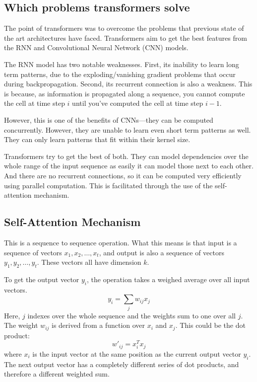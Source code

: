 \subsection{Which problems transformers solve}
The point of transformers was to overcome the problems that previous state of the art architectures have faced. Transformers aim to get the best features from the RNN and Convolutional Neural Network (CNN) models.

The RNN model has two notable weaknesses. First, its inability to learn long term patterns, due to the exploding/vanishing gradient problems that occur during backpropagation.
Second, its recurrent connection is also a weakness. This is because, as information is propagated along a sequence, you cannot compute the cell at time step $i$ until you've computed the cell at time step $i-1$.

However, this is one of the benefits of CNNs---they can be computed concurrently. However, they are unable to learn even short term patterns as well. They can only learn patterns that fit within their kernel size.

Transformers try to get the best of both.
They can model dependencies over the whole range of the input sequence as easily it can model those next to each other. And there are no recurrent connections, so it can be computed very efficiently using parallel computation. This is facilitated through the use of the self-attention mechanism.\cite{TransformersScratchPeterbloem}


\subsection{Self-Attention Mechanism}
This is a sequence to sequence operation. What this means is that input is a sequence of vectors $x_{1},x_{2},\ldots, x_{t}$, and output is also a sequence of vectors $y_{1},y_{2},\ldots, y_{t}$.
These vectors all have dimension $k$.

To get the output vector $y_{i}$, the operation takes a weighed average over all input vectors.
$$
y_{i}=\sum_{j}w_{ij}x_{j}
$$
Here, $j$ indexes over the whole sequence and the weights sum to one over all $j$.
The weight $w_{ij}$ is derived from a function over $x_{i}$ and $x_{j}$.
This could be the dot product:
$$
w'_{ij}=x_{i}^Tx_{j}
$$
where $x_{i}$ is the input vector at the same position as the current output vector $y_{i}$.
The next output vector has a completely different series of dot products, and therefore a different weighted sum.

